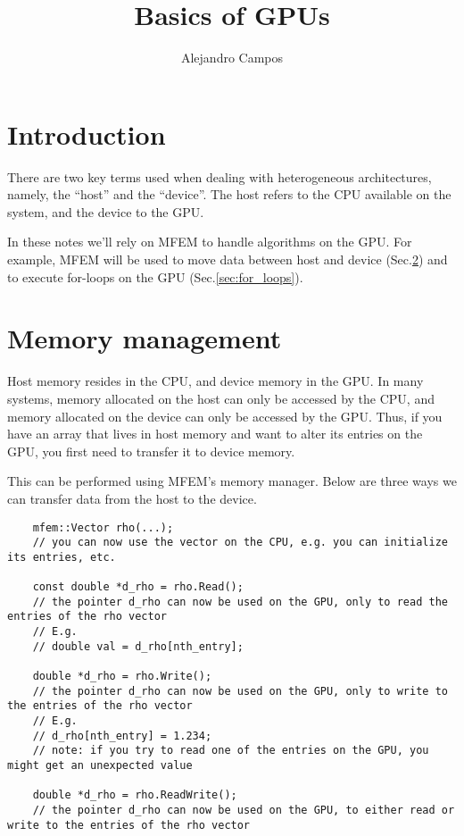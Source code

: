 \documentclass[a4paper,11pt]{article}
\title{Basics of GPUs}
\author{Alejandro Campos}
\begin{document}
\maketitle
\tableofcontents

\section{Introduction}
There are two key terms used when dealing with heterogeneous architectures, namely, the ``host'' and the ``device''. The host refers to the CPU available on the system, and the device to the GPU. 

In these notes we'll rely on MFEM to handle algorithms on the GPU. For example, MFEM will be used to move data between host and device (Sec.\@ \ref{sec:memory_management}) and to execute for-loops on the GPU (Sec.\@ \ref{sec:for_loops}).

\section{Memory management}
\label{sec:memory_management}
Host memory resides in the CPU, and device memory in the GPU. In many systems, memory allocated on the host can only be accessed by the CPU, and memory allocated on the device can only be accessed by the GPU. Thus, if you have an array that lives in host memory and want to alter its entries on the GPU, you first need to transfer it to device memory.

This can be performed using MFEM's memory manager. Below are three ways we can transfer data from the host to the device.
\begin{lstlisting}
    mfem::Vector rho(...);
    // you can now use the vector on the CPU, e.g. you can initialize its entries, etc.

    const double *d_rho = rho.Read();
    // the pointer d_rho can now be used on the GPU, only to read the entries of the rho vector
    // E.g.
    // double val = d_rho[nth_entry];

    double *d_rho = rho.Write();
    // the pointer d_rho can now be used on the GPU, only to write to the entries of the rho vector
    // E.g.
    // d_rho[nth_entry] = 1.234;
    // note: if you try to read one of the entries on the GPU, you might get an unexpected value

    double *d_rho = rho.ReadWrite();
    // the pointer d_rho can now be used on the GPU, to either read or write to the entries of the rho vector
\end{lstlisting}
\end{document}
